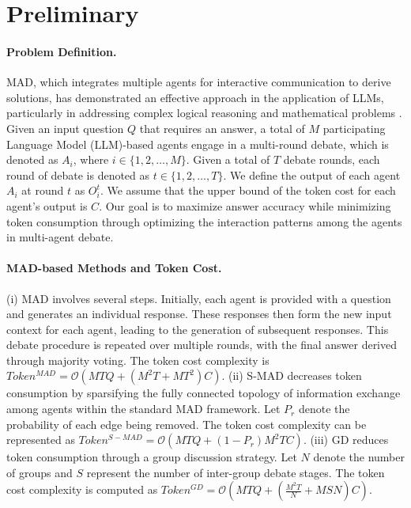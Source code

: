 \section{Preliminary} 
\label{sec:preliminary}

\paragraph{Problem Definition.} MAD, which integrates multiple agents for interactive communication to derive solutions, has demonstrated an effective approach in the application of LLMs, particularly in addressing complex logical reasoning and mathematical problems \citep{liang2023encouraging, chan2023chateval}. Given an input question $Q$ that requires an answer, a total of $M$ participating Language Model (LLM)-based agents engage in a multi-round debate, which is denoted as $A_i$, where $i \in \{1, 2, \ldots, M\}$.
Given a total of $T$ debate rounds, each round of debate is denoted as $t \in \{1, 2, \ldots, T\}$. We define the output of each agent $A_i$ at round $t$ as $O_i^{t}$. We assume that the upper bound of the token cost for each agent's output is $C$. Our goal is to maximize answer accuracy while minimizing token consumption through optimizing the interaction patterns among the agents in multi-agent debate.

\paragraph{MAD-based Methods and Token Cost.}
(i) MAD \citep{liang2023encouraging} involves several steps. Initially, each agent is provided with a question and generates an individual response. These responses then form the new input context for each agent, leading to the generation of subsequent responses. This debate procedure is repeated over multiple rounds, with the final answer derived through majority voting. The token cost complexity is $Token^{MAD} = \mathcal{O}\left( MTQ+(M^2T+MT^2)C \right)$. (ii) S-MAD \citep{li2024improving} decreases token consumption by sparsifying the fully connected topology of information exchange among agents within the standard MAD framework. Let $P_r$ denote the probability of each edge being removed. The token cost complexity can be represented as $Token^{S-MAD} = \mathcal{O}\left( MTQ+(1-P_r)M^2TC \right)$. (iii) GD \citep{liu2024GroupDebate} reduces token consumption through a group discussion strategy. Let $N$ denote the number of groups and $S$ represent the number of inter-group debate stages. The token cost complexity is computed as $Token^{GD} = \mathcal{O}\left(MTQ+(\frac{M^2T} {N}+MSN)C\right)$.